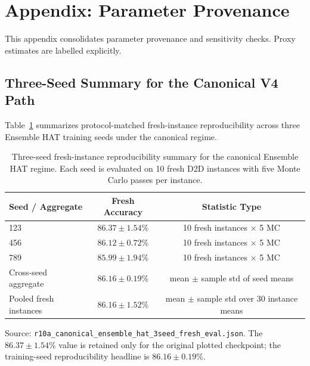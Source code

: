 \section{Appendix: Parameter Provenance}
\label{deprecated-sec:appendix-provenance}

This appendix consolidates parameter provenance and sensitivity checks. Proxy estimates are labelled explicitly.

\subsection{Three-Seed Summary for the Canonical V4 Path}
\label{deprecated-subsec:v4-rerun-sanity}

Table~\ref{deprecated-tab:v4-three-seed-summary} summarizes protocol-matched fresh-instance reproducibility across three Ensemble HAT training seeds under the canonical regime.

\begin{table}[ht]
\centering
\caption{Three-seed fresh-instance reproducibility summary for the canonical Ensemble HAT regime. Each seed is evaluated on 10 fresh D2D instances with five Monte Carlo passes per instance.}
\label{deprecated-tab:v4-three-seed-summary}
\begin{tabular}{lcc}
\toprule
\textbf{Seed / Aggregate} & \textbf{Fresh Accuracy} & \textbf{Statistic Type} \\
\midrule
123 & \(86.37\pm1.54\)\% & 10 fresh instances \(\times\) 5 MC \\
456 & \(86.12\pm0.72\)\% & 10 fresh instances \(\times\) 5 MC \\
789 & \(85.99\pm1.94\)\% & 10 fresh instances \(\times\) 5 MC \\
\midrule
Cross-seed aggregate & \(\mathbf{86.16\pm0.19}\)\% & mean \(\pm\) sample std of seed means \\
Pooled fresh instances & \(86.16\pm1.52\)\% & mean \(\pm\) sample std over 30 instance means \\
\bottomrule
\end{tabular}
\footnotesize Source: \texttt{r10a\_canonical\_ensemble\_hat\_3seed\_fresh\_eval.json}. The \(86.37\pm1.54\%\) value is retained only for the original plotted checkpoint; the training-seed reproducibility headline is \(86.16\pm0.19\%\).
\end{table}

\FloatBarrier

